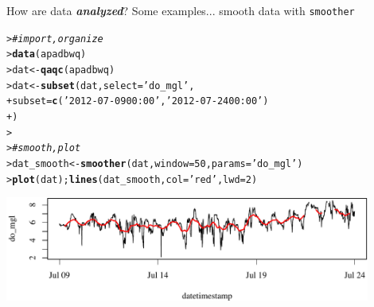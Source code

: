 \documentclass[serif]{beamer}\usepackage[]{graphicx}\usepackage[]{color}
\makeatletter
\newcommand{\hlnum}[1]{\textcolor[rgb]{0.686,0.059,0.569}{#1}}%
\newcommand{\hlstr}[1]{\textcolor[rgb]{0.192,0.494,0.8}{#1}}%
\newcommand{\hlcom}[1]{\textcolor[rgb]{0.678,0.584,0.686}{\textit{#1}}}%
\newcommand{\hlstd}[1]{\textcolor[rgb]{0.345,0.345,0.345}{#1}}%
\newcommand{\hlkwb}[1]{\textcolor[rgb]{0.69,0.353,0.396}{#1}}%
\newcommand{\hlkwc}[1]{\textcolor[rgb]{0.333,0.667,0.333}{#1}}%
\newcommand{\hlkwd}[1]{\textcolor[rgb]{0.737,0.353,0.396}{\textbf{#1}}}%
\newenvironment{kframe}{%
 \def\at@end@of@kframe{}%
 \ifinner\ifhmode%
  \def\at@end@of@kframe{\end{minipage}}%
  \begin{minipage}{\columnwidth}%
 \fi\fi%
 \def\FrameCommand##1{\hskip\@totalleftmargin \hskip-\fboxsep
 \colorbox{shadecolor}{##1}\hskip-\fboxsep
     \hskip-\linewidth \hskip-\@totalleftmargin \hskip\columnwidth}%
 \MakeFramed {\advance\hsize-\width
   \@totalleftmargin\z@ \linewidth\hsize
   \@setminipage}}%
 {\par\unskip\endMakeFramed%
 \at@end@of@kframe}
\newenvironment{knitrout}{}{} %
\newcommand{\Bigtxt}[1]{\textbf{\textit{#1}}}
\makeatother
\begin{document}
\begin{frame}[fragile,t]{How are data \Bigtxt{analyzed}?}
Some examples... smooth data with \texttt{smoother}
\begin{knitrout}\scriptsize
{}\color{fgcolor}\begin{kframe}
\begin{alltt}
\hlstd{> }\hlcom{# import, organize}
\hlstd{> }\hlkwd{data}\hlstd{(apadbwq)}
\hlstd{> }\hlstd{dat} \hlkwb{<-} \hlkwd{qaqc}\hlstd{(apadbwq)}
\hlstd{> }\hlstd{dat} \hlkwb{<-} \hlkwd{subset}\hlstd{(dat,} \hlkwc{select} \hlstd{=} \hlstr{'do_mgl'}\hlstd{,}
\hlstd{+ }  \hlkwc{subset} \hlstd{=} \hlkwd{c}\hlstd{(}\hlstr{'2012-07-09 00:00'}\hlstd{,} \hlstr{'2012-07-24 00:00'}\hlstd{)}
\hlstd{+ }  \hlstd{)}
\hlstd{> }
\hlstd{> }\hlcom{# smooth, plot}
\hlstd{> }\hlstd{dat_smooth} \hlkwb{<-} \hlkwd{smoother}\hlstd{(dat,} \hlkwc{window} \hlstd{=} \hlnum{50}\hlstd{,} \hlkwc{params} \hlstd{=} \hlstr{'do_mgl'}\hlstd{)}
\hlstd{> }\hlkwd{plot}\hlstd{(dat);} \hlkwd{lines}\hlstd{(dat_smooth,} \hlkwc{col} \hlstd{=} \hlstr{'red'}\hlstd{,} \hlkwc{lwd} \hlstd{=} \hlnum{2}\hlstd{)}
\end{alltt}
\end{kframe}

{\centering \includegraphics[width=0.9\textwidth]{fig//smooth} 

}



\end{knitrout}
\end{frame}
\end{document}
